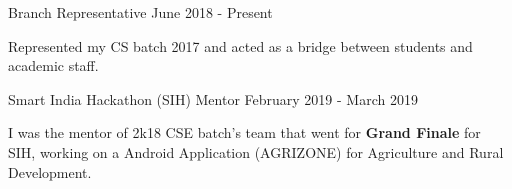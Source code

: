 

\begin{cventries}

  \projects
    {} %
    {Branch Representative} %
    {June 2018 - Present} %
    {} %
    {
      \begin{por} %
        \item []{Represented my CS batch 2017 and acted as a bridge between students and academic staff.}
      \end{por}
    }

\projects
    {} %
    {Smart India Hackathon (SIH) Mentor} %
    {February 2019 - March 2019} %
    {} %
    {
      \begin{por} %
        \item []{I was the mentor of 2k18 CSE batch's team that went for \textbf{Grand Finale} for SIH, working on a Android Application (AGRIZONE) for Agriculture and Rural Development.}
      \end{por}
    }

\end{cventries}
